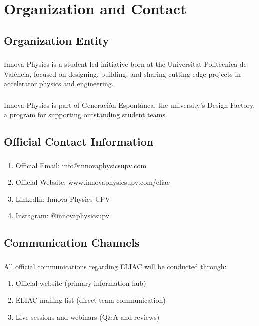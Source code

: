 
\renewcommand{\thesection}{OC}
\section{Organization and Contact}

\subsection{Organization Entity}

\subsubsection{}
Innova Physics is a student-led initiative born at the Universitat Politècnica de València, focused on designing, building, and sharing cutting-edge projects in accelerator physics and engineering.

\subsubsection{}
Innova Physics is part of Generación Espontánea, the university's Design Factory, a program for supporting outstanding student teams.

\subsection{Official Contact Information}

\subsubsection{}
\begin{enumerate}[noitemsep]
    \item Official Email: info@innovaphysicsupv.com
    \item Official Website: www.innovaphysicsupv.com/eliac
    \item LinkedIn: Innova Physics UPV
    \item Instagram: @innovaphysicsupv
\end{enumerate}

\subsection{Communication Channels}

\subsubsection{}
All official communications regarding ELIAC will be conducted through:
\begin{enumerate}[noitemsep]
    \item Official website (primary information hub)
    \item ELIAC mailing list (direct team communication)
    \item Live sessions and webinars (Q\&A and reviews)
\end{enumerate}

